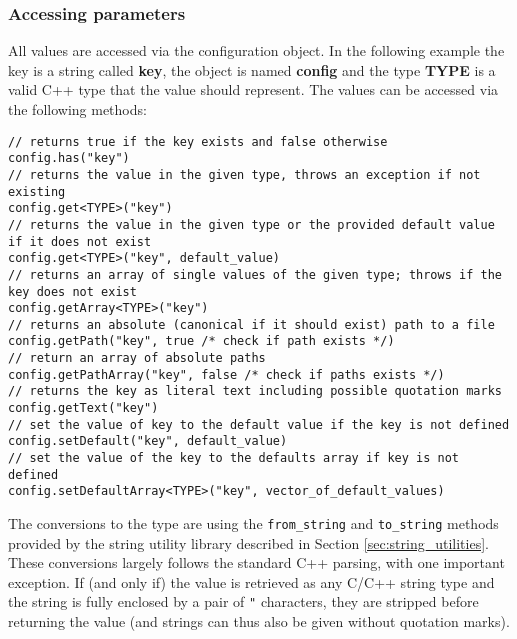 \subsubsection{Accessing parameters}
\label{sec:accessing_parameters}
All values are accessed via the configuration object. In the following example the key is a string called \textbf{key}, the object is named \textbf{config} and the type \textbf{TYPE} is a valid C++ type that the value should represent. The values can be accessed via the following methods:
\begin{verbatim}
// returns true if the key exists and false otherwise
config.has("key") 
// returns the value in the given type, throws an exception if not existing
config.get<TYPE>("key") 
// returns the value in the given type or the provided default value if it does not exist
config.get<TYPE>("key", default_value) 
// returns an array of single values of the given type; throws if the key does not exist
config.getArray<TYPE>("key")
// returns an absolute (canonical if it should exist) path to a file
config.getPath("key", true /* check if path exists */)
// return an array of absolute paths
config.getPathArray("key", false /* check if paths exists */)
// returns the key as literal text including possible quotation marks
config.getText("key") 
// set the value of key to the default value if the key is not defined
config.setDefault("key", default_value) 
// set the value of the key to the defaults array if key is not defined
config.setDefaultArray<TYPE>("key", vector_of_default_values)
\end{verbatim}

The conversions to the type are using the \texttt{from\_string} and \texttt{to\_string} methods provided by the string utility library described in Section \ref{sec:string_utilities}. These conversions largely follows the standard C++ parsing, with one important exception. If (and only if) the value is retrieved as any C/C++ string type and the string is fully enclosed by a pair of \texttt{"} characters, they are stripped before returning the value (and strings can thus also be given without quotation marks).

